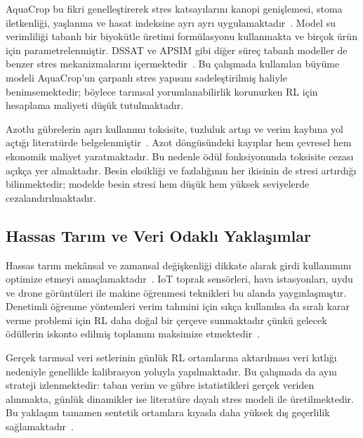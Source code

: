 \documentclass[10pt,twocolumn,a4paper]{article}
\begin{document}
AquaCrop bu fikri genelle\c{s}tirerek stres katsay{\i}lar{\i}n{\i} kanopi geni\c{s}lemesi, stoma iletkenli\u{g}i, ya\c{s}lanma ve hasat indeksine ayr{\i} ayr{\i} uygulamaktad{\i}r~\cite{raes2009aquacrop,hsiao2009aquacrop,steduto2009aquacrop}. Model su verimlili\u{g}i tabanl{\i} bir biyok\"utle \"uretimi form\"ulasyonu kullanmakta ve bir\c{c}ok \"ur\"un i\c{c}in parametrelenmi\c{s}tir. DSSAT ve APSIM gibi di\u{g}er s\"ure\c{c} tabanl{\i} modeller de benzer stres mekanizmalar{\i}n{\i} i\c{c}ermektedir~\cite{jones2003dssat}. Bu \c{c}al{\i}\c{s}mada kullan{\i}lan b\"uy\"ume modeli AquaCrop'un \c{c}arpanl{\i} stres yap{\i}s{\i}n{\i} sadele\c{s}tirilmi\c{s} haliyle benimsemektedir; b\"oylece tar{\i}msal yorumlanabilirlik korunurken RL i\c{c}in hesaplama maliyeti d\"u\c{s}\"uk tutulmaktad{\i}r.

Azotlu g\"ubrelerin a\c{s}{\i}r{\i} kullan{\i}m{\i} toksisite, tuzluluk art{\i}\c{s}{\i} ve verim kayb{\i}na yol a\c{c}t{\i}\u{g}{\i} literat\"urde belgelenmi\c{s}tir~\cite{salvagiotti2009nitrogen,cameron2013nitrogen}. Azot d\"ong\"us\"undeki kay{\i}plar hem \c{c}evresel hem ekonomik maliyet yaratmaktad{\i}r. Bu nedenle \"od\"ul fonksiyonunda toksisite cezas{\i} a\c{c}{\i}k\c{c}a yer almaktad{\i}r. Besin eksikli\u{g}i ve fazlal{\i}\u{g}{\i}n{\i}n her ikisinin de stresi art{\i}rd{\i}\u{g}{\i} bilinmektedir; modelde besin stresi hem d\"u\c{s}\"uk hem y\"uksek seviyelerde cezaland{\i}r{\i}lmaktad{\i}r.

\subsection{Hassas Tar{\i}m ve Veri Odakl{\i} Yakla\c{s}{\i}mlar}
Hassas tar{\i}m mek\^ansal ve zamansal de\u{g}i\c{s}kenli\u{g}i dikkate alarak girdi kullan{\i}m{\i}n{\i} optimize etmeyi ama\c{c}lamaktad{\i}r~\cite{zhang2002precision}. IoT toprak sens\"orleri, hava istasyonlar{\i}, uydu ve drone g\"or\"unt\"uleri ile makine \"o\u{g}renmesi teknikleri bu alanda yayg{\i}nla\c{s}m{\i}\c{s}t{\i}r. Denetimli \"o\u{g}renme y\"ontemleri verim tahmini i\c{c}in s{\i}k\c{c}a kullan{\i}lsa da s{\i}ral{\i} karar verme problemi i\c{c}in RL daha do\u{g}al bir \c{c}er\c{c}eve sunmaktad{\i}r \c{c}\"unk\"u gelecek \"od\"ullerin iskonto edilmi\c{s} toplam{\i}n{\i} maksimize etmektedir~\cite{kamilaris2018deep}.

Ger\c{c}ek tar{\i}msal veri setlerinin g\"unl\"uk RL ortamlar{\i}na aktar{\i}lmas{\i} veri k{\i}tl{\i}\u{g}{\i} nedeniyle genellikle kalibrasyon yoluyla yap{\i}lmaktad{\i}r. Bu \c{c}al{\i}\c{s}mada da ayn{\i} strateji izlenmektedir: taban verim ve g\"ubre istatistikleri ger\c{c}ek veriden al{\i}nmakta, g\"unl\"uk dinamikler ise literat\"ure dayal{\i} stres modeli ile \"uretilmektedir. Bu yakla\c{s}{\i}m tamamen sentetik ortamlara k{\i}yasla daha y\"uksek d{\i}\c{s} ge\c{c}erlilik sa\u{g}lamaktad{\i}r~\cite{overweg2021cropgym}.
\end{document}
